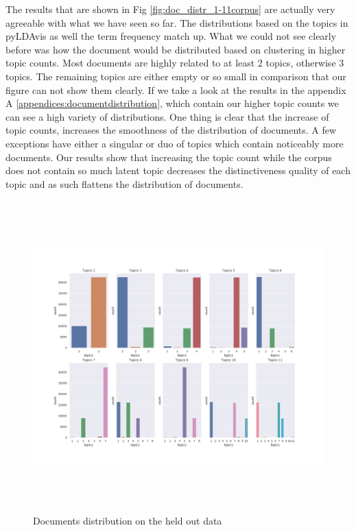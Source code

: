 The results that are shown in Fig \ref{fig:doc_distr_1-11corpus} are actually very agreeable with what we have seen so far. The distributions based on the topics in pyLDAvis as well the term frequency match up. What we could not see clearly before was how the document would be distributed based on clustering in higher topic counts. Most documents are highly related to at least 2 topics, otherwise 3 topics. The remaining topics are either empty or so small in comparison that our figure can not show them clearly. If we take a look at the results in the appendix A \ref{appendices:documentdistribution}, which contain our higher topic counts we can see a high variety of distributions. One thing is clear that the increase of topic counts, increases the smoothness of the distribution of documents. A few exceptions have either a singular or duo of topics which contain noticeably more documents. Our results show that increasing the topic count while the corpus does not contain so much latent topic decreases the distinctiveness quality of each topic and as such flattens the distribution of documents.

\begin{figure}[h]
    \centering
    \includegraphics[width=16cm, height=12cm]{figures/doc_distr/doc_distribution_1-11.png}
    \caption{Documents distribution on the held out data}
    \label{fig:doc_distr_1-11held_out}
\end{figure}
\FloatBarrier

